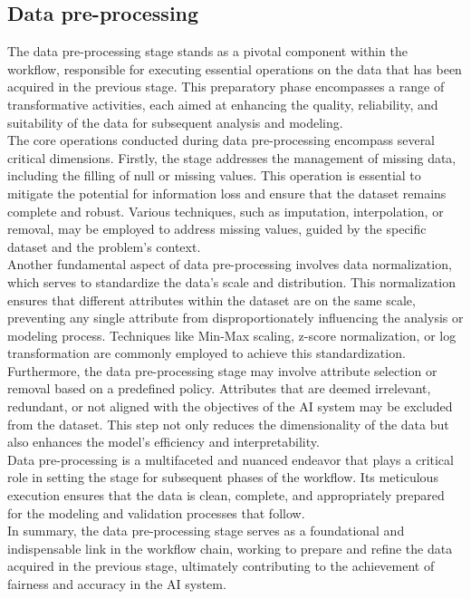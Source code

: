 \documentclass[12pt,a4paper,openright,twoside]{book}
\begin{document}
\subsection{Data pre-processing}
The data pre-processing stage stands as a pivotal component within the workflow, responsible for executing essential operations on the data that has been acquired in the previous stage. This preparatory phase encompasses a range of transformative activities, each aimed at enhancing the quality, reliability, and suitability of the data for subsequent analysis and modeling. \\
The core operations conducted during data pre-processing encompass several critical dimensions. Firstly, the stage addresses the management of missing data, including the filling of null or missing values. This operation is essential to mitigate the potential for information loss and ensure that the dataset remains complete and robust. Various techniques, such as imputation, interpolation, or removal, may be employed to address missing values, guided by the specific dataset and the problem's context. \\
Another fundamental aspect of data pre-processing involves data normalization, which serves to standardize the data's scale and distribution. This normalization ensures that different attributes within the dataset are on the same scale, preventing any single attribute from disproportionately influencing the analysis or modeling process. Techniques like Min-Max scaling, z-score normalization, or log transformation are commonly employed to achieve this standardization. \\
Furthermore, the data pre-processing stage may involve attribute selection or removal based on a predefined policy. Attributes that are deemed irrelevant, redundant, or not aligned with the objectives of the AI system may be excluded from the dataset. This step not only reduces the dimensionality of the data but also enhances the model's efficiency and interpretability. \\
Data pre-processing is a multifaceted and nuanced endeavor that plays a critical role in setting the stage for subsequent phases of the workflow. Its meticulous execution ensures that the data is clean, complete, and appropriately prepared for the modeling and validation processes that follow. \\
In summary, the data pre-processing stage serves as a foundational and indispensable link in the workflow chain, working to prepare and refine the data acquired in the previous stage, ultimately contributing to the achievement of fairness and accuracy in the AI system.
\end{document}
